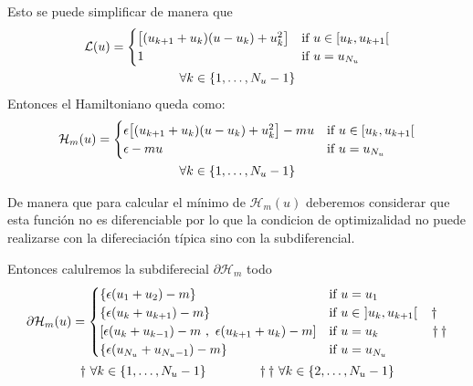 %
Esto se puede simplificar de manera que 
\begin{gather}
    {\mathcal{L}(u)} = \begin{cases}
        \big[ (u_{k+1}+u_{k}) (u-u_k) + u_k^2 \big] & \text{if}  u \in [u_k,u_{k+1}[ \\
        1 & \text{if} \ u = u_{N_u} 
    \end{cases} \\
    \notag \forall k \in \{1,\dots,N_u-1\}
\end{gather}
%
Entonces el Hamiltoniano queda como:
\begin{gather}
    {\mathcal{H}_m(u)} = \begin{cases}
        \epsilon\big[ (u_{k+1}+u_{k}) (u-u_k) + u_k^2 \big] -mu & \text{if}  u \in [u_k,u_{k+1}[ \\
        \epsilon-mu & \text{if} \ u = u_{N_u} 
    \end{cases} \\
    \notag \forall k \in \{1,\dots,N_u-1\}
\end{gather}


%
De manera que para calcular el mínimo de $\mathcal{H}_m(u)$ deberemos considerar que esta función no es diferenciable por lo que la condicion de optimizalidad no puede realizarse con la difereciación típica sino con la subdiferencial.

Entonces calulremos la subdiferecial $\partial \mathcal{H}_m$ todo 
\begin{gather}
    \partial \mathcal{H}_m(u) = \begin{cases}
         \{\epsilon(u_1 + u_2) - m \}   & \text{if} \ u = u_1 \\
         \{\epsilon(u_k + u_{k+1})-m\}  & \text{if} \ u \in \ ]u_k,u_{k+1}[ \hspace{1.1em} \dagger\\
         [\epsilon(u_k+u_{k-1})-m \ , \ \epsilon(u_{k+1}+u_k)-m] & \text{if} \ u = u_k \hspace{4.em} \dagger \dagger \\
         \{\epsilon(u_{N_u} + u_{N_u-1}) - m \} & \text{if} \ u = u_{N_u} 
    \end{cases} \\
    \notag \dagger \ \forall k \in \{1,\dots,N_u-1\} \hspace{4em}
    \dagger \dagger \ \forall k \in \{2,\dots,N_u-1\}
\end{gather} 

